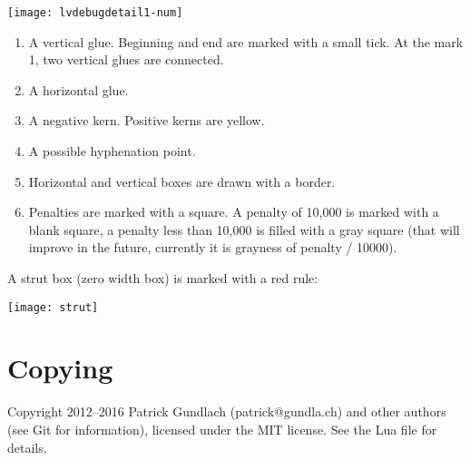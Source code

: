 \documentclass{article}
\begin{document}
\noindent\texttt{[image: lvdebugdetail1-num]}
\begin{enumerate}
	\item A vertical glue. Beginning and end are marked with a small tick. At the mark 1, two vertical glues are connected.
\item A horizontal glue.
\item A negative kern. Positive kerns are yellow.
\item A possible hyphenation point.
\item Horizontal and vertical boxes are drawn with a border.
\item Penalties are marked with a square. A penalty of 10,000 is marked with a blank square, a penalty less than 10,000 is filled with a gray square (that will improve in the future, currently it is grayness of penalty / 10000).
\end{enumerate}

A strut box (zero width box) is marked with a red rule:

\noindent\texttt{[image: strut]}



\section{Copying}

Copyright 2012–2016 Patrick Gundlach (patrick@gundla.ch) and other authors (see Git for information), licensed under the MIT license. See the Lua file for details.
\end{document}
